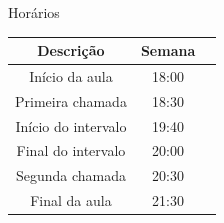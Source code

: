 

\begin{frame}{Horários}
    \vspace{1.0cm}
    \centering
    \begin{tabular}{|c|c|c|}
        \hline
        Descrição & Semana \\
        \hline
        Início da aula   & 18:00   \\
        Primeira chamada   & 18:30   \\
        Início do intervalo  & 19:40   \\
        Final do intervalo   & 20:00   \\
        Segunda chamada   & 20:30   \\
        Final da aula   & 21:30   \\
        \hline
    \end{tabular}
\end{frame}
